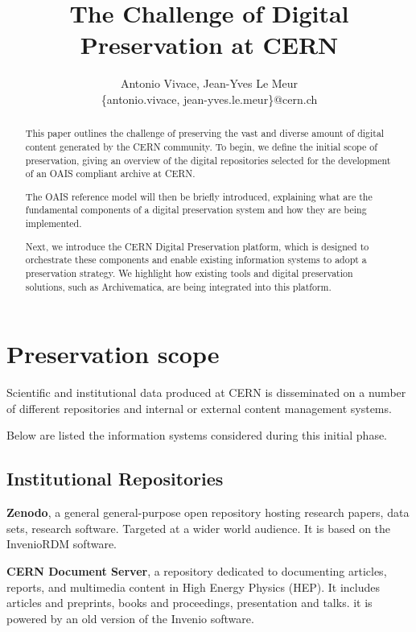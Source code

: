 \documentclass[11pt]{IEEEtran}
\title{ The Challenge of Digital Preservation at CERN }
\author{Antonio Vivace, Jean-Yves Le Meur\\
    \{antonio.vivace, jean-yves.le.meur\}@cern.ch}
\begin{document}
\maketitle

\begin{abstract}
This paper outlines the challenge of preserving the vast and diverse amount of digital content generated by the CERN community.
To begin, we define the initial scope of preservation, giving an overview of the digital repositories selected for the development of an OAIS compliant archive at CERN.

The OAIS reference model will then be briefly introduced, explaining what are the fundamental components of a digital preservation system and how they are being  implemented.

Next, we introduce the CERN Digital Preservation platform, which is designed to orchestrate these components and enable existing information systems to adopt a preservation strategy. We highlight how existing tools and digital preservation solutions, such as Archivematica, are being integrated into this platform.

\end{abstract}

\section{Preservation scope}

Scientific and institutional data produced at CERN is disseminated on a number of different repositories and internal or external content management systems.

Below are listed the information systems considered during this initial phase.

\subsection{Institutional Repositories}

\textbf{Zenodo}, a general general-purpose open repository hosting research papers, data sets, research software. Targeted at a wider world audience. It is based on the InvenioRDM \cite{InvenioRDMinveniosoftwareorg-2023-03-16} software.

\textbf{CERN Document Server}, a repository dedicated to documenting articles, reports, and multimedia content in High Energy Physics (HEP). It includes articles and preprints, books and proceedings, presentation and talks. it is powered by an old version of the Invenio software.
\end{document}
